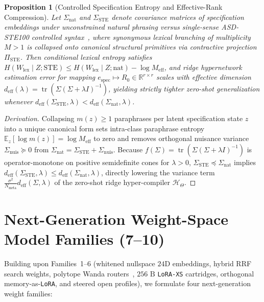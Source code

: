 \documentclass[11pt,a4paper]{article}
\newtheorem{proposition}{Proposition}
\begin{document}
\begin{proposition}[Controlled Specification Entropy and Effective-Rank Compression]
\label{prop:ste}
Let $\Sigma_{\text{nat}}$ and $\Sigma_{\text{STE}}$ denote covariance matrices of specification embeddings under unconstrained natural phrasing versus single-sense ASD-STE100 controlled syntax~\cite{asdste100}, where synonymous lexical branching of multiplicity $M > 1$ is collapsed onto canonical structural primitives via contractive projection $\Pi_{\text{STE}}$. Then conditional lexical entropy satisfies $H(W_{\text{lex}} \mid Z; \text{STE}) \le H(W_{\text{lex}} \mid Z; \text{nat}) - \log M_{\text{eff}}$, and ridge hypernetwork estimation error for mapping $e_{\text{spec}} \mapsto R_0 \in \mathbb{R}^{r \times r}$ scales with effective dimension $d_{\text{eff}}(\lambda) = \operatorname{tr}(\Sigma (\Sigma + \lambda I)^{-1})$, yielding strictly tighter zero-shot generalization whenever $d_{\text{eff}}(\Sigma_{\text{STE}}, \lambda) < d_{\text{eff}}(\Sigma_{\text{nat}}, \lambda)$.
\end{proposition}
\begin{proof}[Derivation]
Collapsing $m(z) \ge 1$ paraphrases per latent specification state $z$ into a unique canonical form sets intra-class paraphrase entropy $\mathbb{E}_z[\log m(z)] = \log M_{\text{eff}}$ to zero and removes orthogonal nuisance variance $\Sigma_{\text{nuis}} \succeq 0$ from $\Sigma_{\text{nat}} = \Sigma_{\text{STE}} + \Sigma_{\text{nuis}}$. Because $f(\Sigma) = \operatorname{tr}(\Sigma(\Sigma + \lambda I)^{-1})$ is operator-monotone on positive semidefinite cones for $\lambda > 0$, $\Sigma_{\text{STE}} \preceq \Sigma_{\text{nat}}$ implies $d_{\text{eff}}(\Sigma_{\text{STE}}, \lambda) \le d_{\text{eff}}(\Sigma_{\text{nat}}, \lambda)$, directly lowering the variance term $\frac{\sigma^2}{N_{\text{meta}}} d_{\text{eff}}(\Sigma, \lambda)$ of the zero-shot ridge hyper-compiler $\mathcal{H}_\Theta$.
\end{proof}

\section{Next-Generation Weight-Space Model Families (7--10)}

Building upon Families~1--6 (whitened nullspace $24\text{D}$ embeddings, hybrid RRF search weights, polytope Wanda routers~\cite{sun2024wanda}, $256\text{ B}$ \texttt{LoRA-XS} cartridges, orthogonal memory-as-\texttt{LoRA}, and steered open profiles), we formulate four next-generation weight families:
\end{document}
